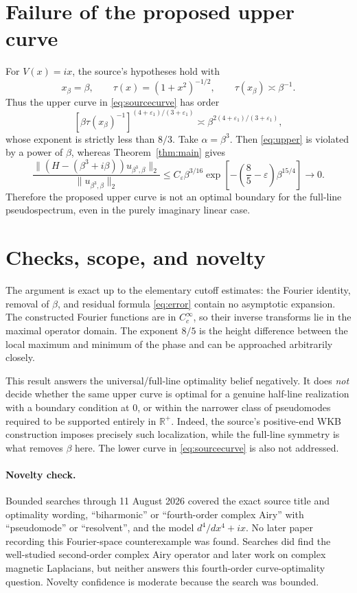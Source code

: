 \documentclass[11pt]{article}
\newcommand{\R}{\mathbb R}
\begin{document}
\section{Failure of the proposed upper curve}

For $V(x)=ix$, the source's hypotheses hold with
\[
 x_\beta=\beta,\qquad
 \tau(x)=(1+x^2)^{-1/2},\qquad
 \tau(x_\beta)\asymp\beta^{-1}.
\]
Thus the upper curve in \eqref{eq:sourcecurve} has order
\begin{equation}\label{eq:upper}
 [\beta\tau(x_\beta)^{-1}]^{(4+\varepsilon_1)/(3+\varepsilon_1)}
 \asymp
 \beta^{2(4+\varepsilon_1)/(3+\varepsilon_1)},
\end{equation}
whose exponent is strictly less than $8/3$.  Take
$\alpha=\beta^3$.  Then \eqref{eq:upper} is violated by a power of $\beta$,
whereas Theorem~\ref{thm:main} gives
\[
 \frac{\|(H-(\beta^3+i\beta))u_{\beta^3,\beta}\|_2}
      {\|u_{\beta^3,\beta}\|_2}
 \le C_\varepsilon\beta^{3/16}
       \exp\!\left[-\left(\frac85-\varepsilon\right)\beta^{15/4}\right]
 \longrightarrow0.
\]
Therefore the proposed upper curve is not an optimal boundary for the
full-line pseudospectrum, even in the purely imaginary linear case.

\section{Checks, scope, and novelty}

The argument is exact up to the elementary cutoff estimates: the Fourier
identity, removal of $\beta$, and residual formula \eqref{eq:error} contain no
asymptotic expansion.  The constructed Fourier functions are in
$C_c^\infty$, so their inverse transforms lie in the maximal operator domain.
The exponent $8/5$ is the height difference between the local maximum and
minimum of the phase and can be approached arbitrarily closely.

This result answers the universal/full-line optimality belief negatively.  It
does \emph{not} decide whether the same upper curve is optimal for a genuine
half-line realization with a boundary condition at $0$, or within the
narrower class of pseudomodes required to be supported entirely in
$\R^+$.  Indeed, the source's positive-end WKB construction imposes precisely
such localization, while the full-line symmetry is what removes $\beta$ here.
The lower curve in \eqref{eq:sourcecurve} is also not addressed.

\paragraph{Novelty check.}
Bounded searches through 11 August 2026 covered the exact source title and
optimality wording, ``biharmonic'' or ``fourth-order complex Airy'' with
``pseudomode'' or ``resolvent'', and the model $d^4/dx^4+ix$.  No later paper
recording this Fourier-space counterexample was found.  Searches did find
the well-studied second-order complex Airy operator and later work on complex
magnetic Laplacians, but neither answers this fourth-order curve-optimality
question.  Novelty confidence is moderate because the search was bounded.
\end{document}
